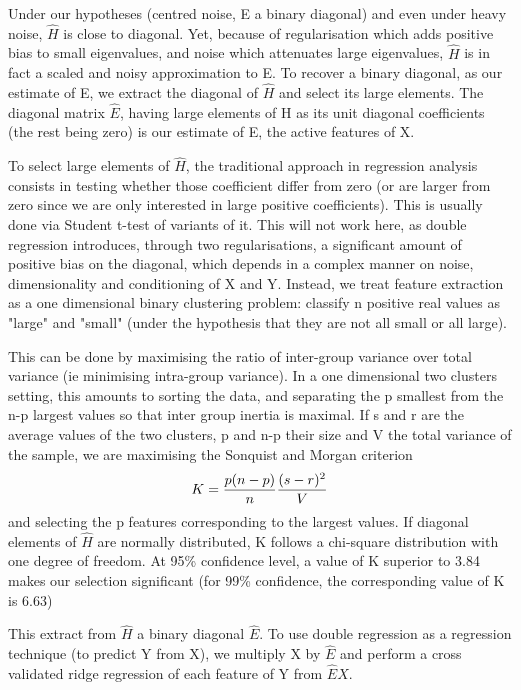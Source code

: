 \documentclass{article}
\begin{document}
Under our hypotheses (centred noise, E a binary diagonal) and even under heavy noise, $\hat H$ is close to diagonal.
%
Yet, because of regularisation which adds positive bias to small eigenvalues, and noise which attenuates large eigenvalues, $\hat H$ is in fact a scaled and noisy approximation to E.
%
To recover a binary diagonal, as our estimate of E, we extract the diagonal of $\hat H$ and select its large elements.
%
The diagonal matrix $\hat E$, having large elements of H as its unit diagonal coefficients (the rest being zero) is our estimate of E, the active features of X.

To select large elements of $\hat H$, the traditional approach in regression analysis consists in testing whether those coefficient differ from zero (or are larger from zero since we are only interested in large positive coefficients).
%
This is usually done via Student t-test of variants of it.
%
This will not work here, as double regression introduces, through two regularisations, a significant amount of positive bias on the diagonal, which depends in a complex manner on noise, dimensionality and conditioning of X and Y.
%
Instead, we treat feature extraction as a one dimensional binary clustering problem: classify n positive real values as "large" and "small" (under the hypothesis that they are not all small or all large).

This can be done by maximising the ratio of inter-group variance over total variance (ie minimising intra-group variance).
%
In a one dimensional two clusters setting, this amounts to sorting the data, and separating the p smallest from the n-p largest values so that inter group inertia is maximal.
%
If s and r are the average values of the two clusters, p and n-p their size and V the total variance of the sample, we are maximising the Sonquist and Morgan criterion $$K = {p (n-p) \over n} {(s-r)^2 \over V}$$ and selecting the p features corresponding to the largest values.
%
If diagonal elements of $\hat H$ are normally distributed, K follows a chi-square distribution with one degree of freedom.
%
At 95\% confidence level, a value of K superior to 3.84 makes our selection significant (for 99\% confidence, the corresponding value of K is 6.63) \citep{Kass_75}

This extract from $\hat H$ a binary diagonal $\hat E$.
%
To use double regression as a regression technique (to predict Y from X), we multiply X by $\hat E$ and perform a cross validated ridge regression of each feature of Y from $\hat E X$.
\end{document}
